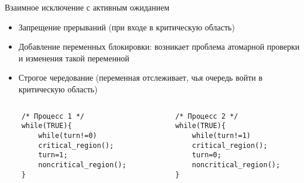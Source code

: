 \documentclass[aspectratio=169,14pt]{beamer}
\begin{document}
\begin{frame}[containsverbatim]{Взаимное исключение с активным ожиданием}
    \begin{itemize}
        \item Запрещение прерываний (при входе в критическую область)
        \item Добавление переменных блокировки: возникает проблема атомарной
        проверки и изменения такой переменной
        \item Строгое чередование (переменная отслеживает, чья очередь войти
        в критическую область)
    \end{itemize}
    \begin{columns}
        \begin{column}{0.5\textwidth}
        \begin{footnotesize}
        \begin{verbatim}
    /* Процесс 1 */
    while(TRUE){
        while(turn!=0)
        critical_region();
        turn=1;
        noncritical_region();
    }
        \end{verbatim}
        \end{footnotesize}
        \end{column}
        \begin{column}{0.5\textwidth}
            \begin{footnotesize}
                \begin{verbatim}
    /* Процесс 2 */
    while(TRUE){
        while(turn!=1)
        critical_region();
        turn=0;
        noncritical_region();
    }
                \end{verbatim}
                \end{footnotesize}
                \end{column}
    \end{columns}
\end{frame}
\end{document}
